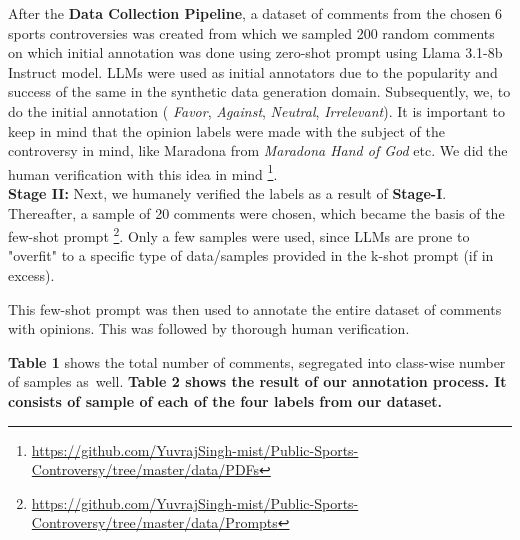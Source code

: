\documentclass[sigconf, review]{acmart}
\begin{document}
 After the \textbf{Data Collection Pipeline}, a dataset of comments from the chosen 6 sports controversies was created from which we sampled 200 random comments on which initial annotation was done using zero-shot prompt using Llama 3.1-8b Instruct model. 
LLMs were used as initial annotators \cite{tan2024largelanguagemodelsdata, pavlovic-poesio-2024-effectiveness} due to the popularity and success of the same in the synthetic data generation domain. 
Subsequently, we, to do the initial annotation ( \textit{Favor}, \textit{Against}, \textit{Neutral}, \textit{Irrelevant}).
It is important to keep in mind that the opinion labels were made with the subject of the controversy in mind, like Maradona from \textit{Maradona Hand of God} etc. We did the human verification with this idea in mind \footnote{\url{https://github.com/YuvrajSingh-mist/Public-Sports-Controversy/tree/master/data/PDFs}}. \\
{\bf Stage II:} Next, we humanely verified the labels as a result of {\bf Stage-I}. Thereafter, a sample of 20 comments were chosen, which became the basis of the few-shot prompt \footnote{\url{https://github.com/YuvrajSingh-mist/Public-Sports-Controversy/tree/master/data/Prompts}}. Only a few samples were used, since LLMs are prone to "overfit" to a specific type of data/samples provided in the k-shot prompt (if in excess).

This few-shot prompt was then used to annotate the entire dataset of comments with opinions. This was followed by thorough human verification.

\textbf{Table 1} shows the total number of comments, segregated into class-wise number of samples as well.
\textbf{Table 2 shows the result of our annotation process. It consists of sample of each of the four labels from our dataset.}

        
\end{document}
